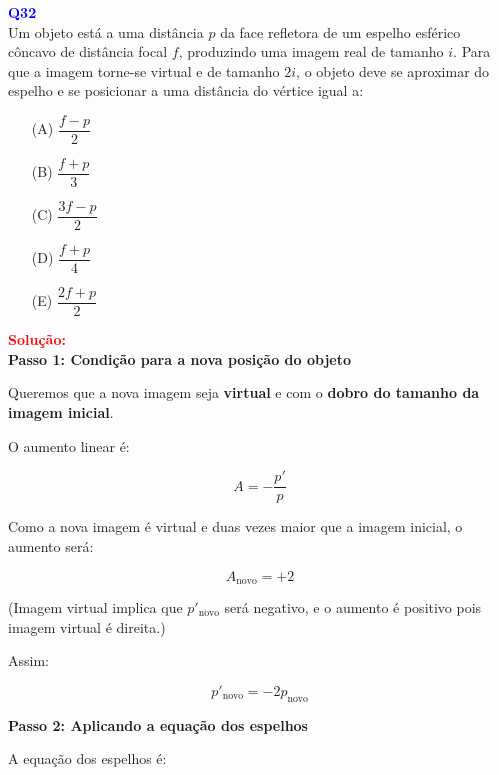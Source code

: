 \documentclass[a4paper,12pt]{article}
\begin{document}
\begin{flushleft}
\textbf{\textcolor{blue}{\Large Q32}}\\

Um objeto está a uma distância \( p \) da face refletora de um espelho esférico côncavo de 
distância focal \( f \), produzindo uma imagem real de tamanho \( i \). Para que a imagem torne-se 
virtual e de tamanho \( 2i \), o objeto deve se aproximar do espelho e se posicionar a uma distância do vértice igual a:


\begin{itemize}
\item[(A)] $\dfrac{f-p}{2}$
\item[(B)] $\dfrac{f+p}{3}$   
\item[(C)] $\dfrac{3f-p}{2}$
\item[(D)] $\dfrac{f+p}{4}$
\item[(E)] $\dfrac{2f+p}{2}$

\end{itemize}

\vspace{0.5cm}

\textcolor{red}{\textbf{Solução:}}\\

\textbf{Passo 1: Condição para a nova posição do objeto}

Queremos que a nova imagem seja \textbf{virtual} e com o \textbf{dobro do tamanho da imagem inicial}. 

O aumento linear é:

\begin{equation}
A = -\frac{p'}{p}
\end{equation}

Como a nova imagem é virtual e duas vezes maior que a imagem inicial, o aumento será:

\begin{equation}
A_{\text{novo}} = +2
\end{equation}

(Imagem virtual implica que $p'_{\text{novo}}$ será negativo, e o aumento é positivo pois imagem virtual é direita.)

Assim:

\begin{equation}
p'_{\text{novo}} = -2p_{\text{novo}}
\end{equation}

\textbf{Passo 2: Aplicando a equação dos espelhos}

A equação dos espelhos é:


\end{flushleft}
\end{document}
